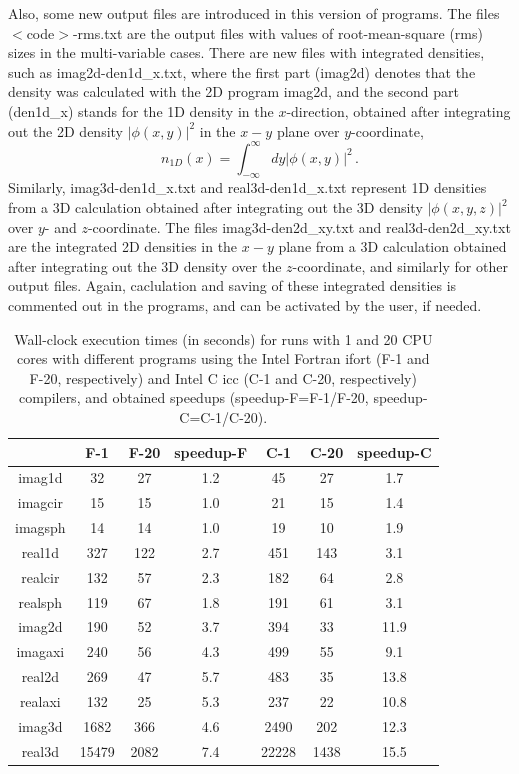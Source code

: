 \documentclass[onecolumn,3p]{elsarticle}
\begin{document}
\begin{small}
Also, some new output files are introduced in this version of programs. 
The files $<$code$>$-rms.txt are the output files with values of root-mean-square (rms) sizes in the multi-variable cases.
There are new files with integrated densities, such as imag2d-den1d\_x.txt, where the first part (imag2d) denotes that the density was calculated 
with the 2D program imag2d, and the second part (den1d\_x) stands for the 1D density in the $x$-direction, obtained after integrating out the 2D density $|\phi(x,y)|^2$
in the $x-y$ plane over $y$-coordinate, 
\begin{equation}
n_{1D}(x)= \int _{-\infty}^{\infty} dy |\phi(x,y)|^2\, .
\end{equation}
Similarly, imag3d-den1d\_x.txt and real3d-den1d\_x.txt represent 1D densities from a 3D calculation obtained after integrating out the 3D density $|\phi(x,y,z)|^2$
over $y$- and $z$-coordinate. 
The files imag3d-den2d\_xy.txt and real3d-den2d\_xy.txt are the integrated 2D densities in the $x-y$ plane from a 
3D calculation obtained after integrating out the 3D density over the $z$-coordinate, and similarly for other output files.
Again, caclulation and saving of these integrated densities is commented out in the programs, and can be activated by the user, if needed.

\begin{table}[tp]
\caption{Wall-clock execution times (in seconds) for runs with 1 and 20 CPU cores with different programs using the 
Intel Fortran ifort (F-1 and F-20, respectively) and Intel C icc (C-1 and C-20, respectively) compilers,
and obtained speedups (speedup-F=F-1/F-20, speedup-C=C-1/C-20).}
\label{tab1}
\centering
\begin{tabular}{ccccccc}
\hline
& F-1 & F-20 & speedup-F & C-1&C-20 & speedup-C \\ \hline
imag1d&32 & 27 &1.2 & 45 & 27&1.7\\
imagcir& 15 & 15 & 1.0& 21 & 15 &1.4\\
imagsph&14 & 14& 1.0 & 19 & 10 & 1.9\\
real1d& {327} & 122&{2.7} & 451 & 143 &3.1\\
realcir& {132} & 57&{2.3} & 182& 64 &2.8\\
realsph& 119 & 67&1.8 & 191 & 61 & 3.1 \\ \hline
imag2d&{190} &{  52}& { 3.7} & {394} & {33} &11.9\\
imagaxi& {240}&{  56}&{ 4.3} & {499} & {55}& { 9.1}\\
real2d& {269} &{ 47}&{ 5.7} & 483 & 35 &13.8\\
realaxi&{132} &{ 25}& { 5.3} & 237 & 22 & 10.8 \\ \hline
imag3d&{1682} & 366&4.6 & 2490& 202 &12.3\\
real3d&{15479} & 2082&7.4 & 22228 & 1438 & 15.5\\ \hline
\end{tabular}
\end{table}


\end{small}
\end{document}
